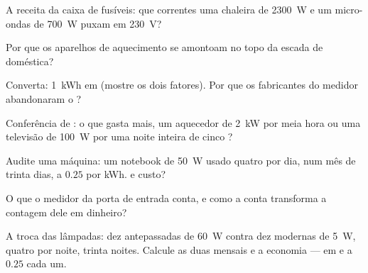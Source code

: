 \begin{exercise}[$\star$]\label{exo:g9:electric-power-energy:3}
A receita da caixa de fusíveis: que correntes uma chaleira de
\qty{2300}{W} e um micro-ondas de \qty{700}{W} puxam em
\qty{230}{V}?
\end{exercise}

\begin{exercise}[$\star$]\label{exo:g9:electric-power-energy:4}
Por que os aparelhos de aquecimento se amontoam no topo da escada de
 doméstica?
\end{exercise}

\begin{exercise}[$\star$]\label{exo:g9:electric-power-energy:5}
Converta: \qty{1}{kWh} em  (mostre os dois fatores). Por que os
fabricantes do medidor abandonaram o ?
\end{exercise}

\begin{exercise}[$\star$]\label{exo:g9:electric-power-energy:6}
Conferência de : o que gasta mais, um aquecedor de \qty{2}{kW}
por meia hora ou uma televisão de \qty{100}{W} por uma noite inteira
de cinco ?
\end{exercise}

\begin{exercise}[$\star$]\label{exo:g9:electric-power-energy:7}
Audite uma máquina: um notebook de \qty{50}{W} usado quatro  por
dia, num mês de trinta dias, a $0.25$ por \unit{kWh}.  e
custo?
\end{exercise}

\begin{exercise}[$\star$]\label{exo:g9:electric-power-energy:8}
O que o medidor da porta de entrada conta, e como a conta transforma
a contagem dele em dinheiro?
\end{exercise}

\begin{exercise}[$\star\star$]\label{exo:g9:electric-power-energy:9}
A troca das lâmpadas: dez antepassadas de \qty{60}{W} contra dez
modernas de \qty{5}{W}, quatro  por noite, trinta noites.
Calcule as duas  mensais e a economia --- em 
e a $0.25$ cada um.
\end{exercise}

